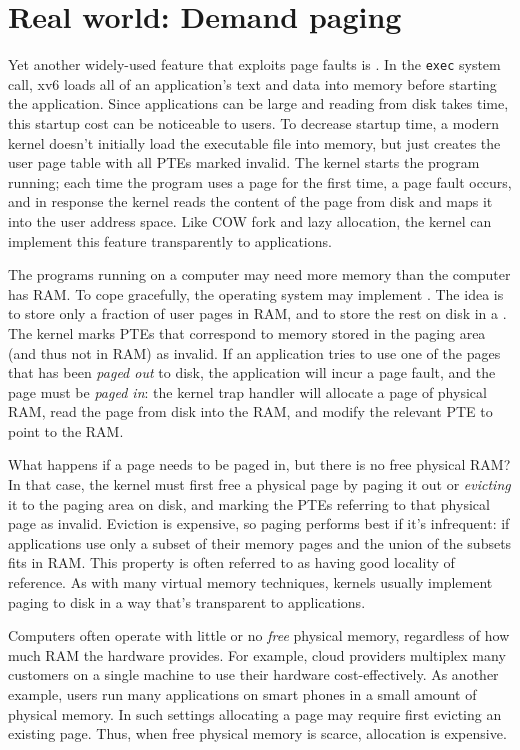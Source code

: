 \section{Real world: Demand paging}

Yet another widely-used feature that exploits page faults is
.  In the \lstinline{exec} system call, xv6 loads all 
of an application's text
and data into memory before starting
the application.  Since applications
can be large and reading from disk takes time, this startup cost can
be noticeable to users. To
decrease startup time, a modern kernel doesn't initially load
the executable file into memory, but just creates the user page table with
all PTEs marked invalid. The kernel starts the program running;
each time the program uses a page for the first time, a page
fault occurs, and in response
the kernel reads the content of the page from disk and
maps it into the user address space.  Like COW fork and lazy
allocation, the kernel can implement this feature transparently to
applications.

The programs running on a computer may need more memory than the
computer has RAM. To cope gracefully, the operating system may
implement . The idea is to store only a
fraction of user pages in RAM, and to store the rest on disk in a
. The kernel marks PTEs that correspond to
memory stored in the paging area (and thus not in RAM) as invalid. If
an application tries to use one of the pages that has been {\it paged
  out} to disk, the application will incur a page fault, and the page
must be {\it paged in}: the kernel trap handler will allocate a page
of physical RAM, read the page from disk into the RAM, and modify the
relevant PTE to point to the RAM.

What happens if a page needs to be paged in, but there is no free
physical RAM? In that case, the kernel must first free a physical page
by paging it out or {\it evicting} it to the paging area on disk, and
marking the PTEs referring to that physical page as invalid. Eviction
is expensive, so paging performs best if it's infrequent: if
applications use only a subset of their memory pages and the union of
the subsets fits in RAM. This property is often referred to as having
good locality of reference. As with many virtual memory techniques,
kernels usually implement paging to disk in a way that's transparent
to applications.

Computers often operate with little or no {\it free} physical memory,
regardless of how much RAM the hardware provides. For example, cloud
providers multiplex many customers on a single machine to use their
hardware cost-effectively. As another example, users run many
applications on smart phones in a small amount of physical memory. In
such settings allocating a page may require first evicting an existing
page. Thus, when free physical memory is scarce, allocation is
expensive.

